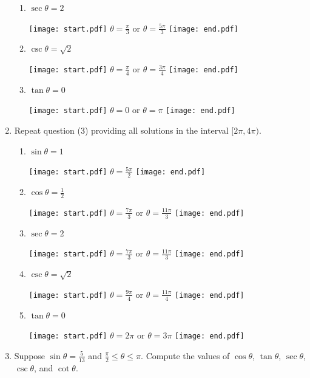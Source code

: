 \documentclass[12pt]{article}
\begin{document}
\begin{enumerate}
\begin{enumerate}
\item $\sec{\theta}=2$

\texttt{[image: start.pdf]}
{$\theta=\frac{\pi}{3}$ or $\theta=\frac{5\pi}{3}$}
\texttt{[image: end.pdf]}


\item $\csc{\theta}=\sqrt{2}$

\texttt{[image: start.pdf]}
{$\theta=\frac{\pi}{4}$ or $\theta=\frac{3\pi}{4}$}
\texttt{[image: end.pdf]}


\item $\tan{\theta}=0$

\texttt{[image: start.pdf]}
{$\theta=0$ or $\theta=\pi$}
\texttt{[image: end.pdf]}


\end{enumerate}

\item Repeat question (3) providing all solutions in the interval $[2\pi,4\pi)$.

\begin{enumerate}

\item $\sin{\theta}=1$

\texttt{[image: start.pdf]}
{$\theta=\frac{5\pi}{2}$}
\texttt{[image: end.pdf]}


\item $\cos{\theta}=\frac{1}{2}$

\texttt{[image: start.pdf]}
{$\theta=\frac{7\pi}{3}$ or $\theta=\frac{11\pi}{3}$}
\texttt{[image: end.pdf]}


\item $\sec{\theta}=2$

\texttt{[image: start.pdf]}
{$\theta=\frac{7\pi}{3}$ or $\theta=\frac{11\pi}{3}$}
\texttt{[image: end.pdf]}


\item $\csc{\theta}=\sqrt{2}$

\texttt{[image: start.pdf]}
{$\theta=\frac{9\pi}{4}$ or $\theta=\frac{11\pi}{4}$}
\texttt{[image: end.pdf]}


\item $\tan{\theta}=0$

\texttt{[image: start.pdf]}
{$\theta=2\pi$ or $\theta=3\pi$}
\texttt{[image: end.pdf]}


\end{enumerate}

\item Suppose $\sin{\theta}=\frac{5}{13}$ and $\frac{\pi}{2} \leq \theta \leq \pi$.  Compute the values of $\cos{\theta}$, $\tan{\theta}$, $\sec{\theta}$, $\csc{\theta}$, and $\cot{\theta}$.


\end{enumerate}
\end{document}
